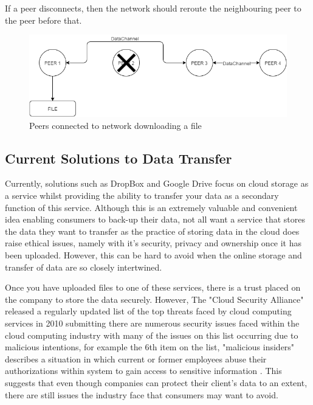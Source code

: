 \documentclass[]{report}
\begin{document}
			If a peer disconnects, then the network should reroute the neighbouring peer to the peer before that.
			\begin{figure}[h!]
				\centering
				\caption{Peers connected to network downloading a file}
				\includegraphics[scale=0.6]{peerdisconnect.png}
			\end{figure}	
			
	
		\subsection*{Current Solutions to Data Transfer}
			Currently, solutions such as DropBox and Google Drive focus on cloud storage as a service whilst providing the ability to transfer your data as a secondary function of this service. Although this is an extremely valuable and convenient idea enabling consumers to back-up their data, not all want a service that stores the data they want to transfer as the practice of storing data in the cloud does raise ethical issues, namely with it's security, privacy and ownership once it has been uploaded. However, this can be hard to avoid when the online storage and transfer of data are so closely intertwined.
			
			Once you have uploaded files to one of these services, there is a trust placed on the company to store the data securely. However, The "Cloud Security Alliance" released a regularly updated list of the top threats faced by cloud computing services in 2010 submitting there are numerous security issues faced within the cloud computing industry with many of the issues on this list occurring due to malicious intentions, for example the 6th item on the list, "malicious insiders" describes a situation in which current or former employees abuse their authorizations within system to gain access to sensitive information \cite{CSA Top Threats}. This suggests that even though companies can protect their client's data to an extent, there are still issues the industry face that consumers may want to avoid.
		 
\end{document}
